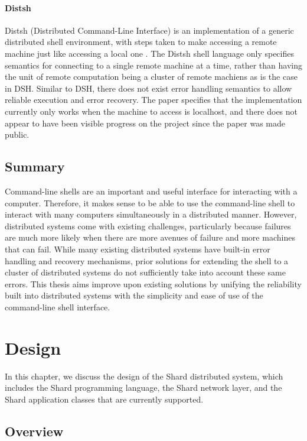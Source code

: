 \documentclass[oneside]{report}
\begin{document}
\subsubsection{Distsh}
Distsh (Distributed Command-Line Interface) is an implementation of a generic distributed shell environment, with steps taken to make accessing a remote machine just like accessing a local one \cite{distsh}.
The Distsh shell language only specifies semantics for connecting to a single remote machine at a time, rather than having the unit of remote computation being a cluster of remote machiens as is the case in DSH.
Similar to DSH, there does not exist error handling semantics to allow reliable execution and error recovery.
The paper specifies that the implementation currently only works when the machine to access is localhost, and there does not appear to have been visible progress on the project since the paper was made public.

\section{Summary}
Command-line shells are an important and useful interface for interacting with a computer.
Therefore, it makes sense to be able to use the command-line shell to interact with many computers simultaneously in a distributed manner.
However, distributed systems come with existing challenges, particularly because failures are much more likely when there are more avenues of failure and more machines that can fail.
While many existing distributed systems have built-in error handling and recovery mechanisms, prior solutions for extending the shell to a cluster of distributed systems do not sufficiently take into account these same errors.
This thesis aims improve upon existing solutions by unifying the reliability built into distributed systems with the simplicity and ease of use of the command-line shell interface.

\chapter{Design}

In this chapter, we discuss the design of the Shard distributed system, which includes the Shard programming language, the Shard network layer, and the Shard application classes that are currently supported.

\section{Overview}
\end{document}
